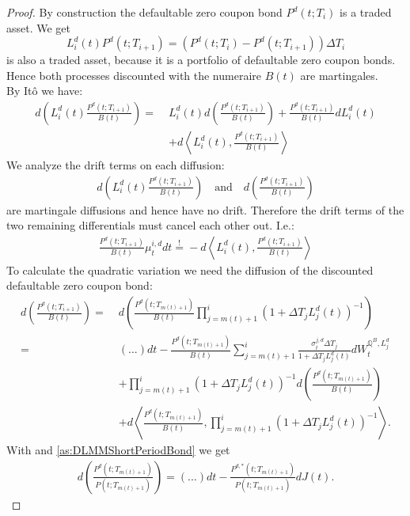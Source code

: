 \documentclass[12pt]{article}
\newcommand{\mbeq}{\overset{!}{=}}
\begin{document}
	\begin{proof}
		By construction the defaultable zero coupon bond $P^d(t; T_i)$ is a traded asset.
		We get 
		\[
			L^d_i(t)P^d(t;T_{i+1}) = (P^{d}(t;T_i) - P^{d}(t;T_{i+1}))\Delta T_i
		\]
		is also a traded asset, because it is a portfolio of defaultable zero coupon bonds. Hence both processes discounted with the numeraire $B(t)$ are martingales.\\
		By Itô we have:
		\begin{align*}
			d\left(L_i^d(t)\frac{P^d(t;T_{i+1})}{B(t)}\right) = \; &L_i^d(t) d\left(\frac{P^d(t;T_{i+1})}{B(t)}\right) +  \frac{P^d(t;T_{i+1})}{B(t)}dL_i^d(t) \\
			&+ d \left\langle  L_i^d(t), \frac{P^d(t;T_{i+1})}{B(t)} \right\rangle
		\end{align*}
		We analyze the drift terms on each diffusion:
		\begin{align*}
			d\left(L_i^d(t)\frac{P^d(t;T_{i+1})}{B(t)}\right) 
			\quad \text{and}\quad 
			d\left(\frac{P^d(t;T_{i+1})}{B(t)}\right)
		\end{align*} 
		are martingale diffusions and hence have no drift.
		Therefore the drift terms of the two remaining differentials must cancel each other out. I.e.:
		\begin{align}\label{defDriftDeriv}
			\frac{P^d(t;T_{i+1})}{B(t)} \mu^{i, d}_t dt \mbeq - d \left\langle  L_i^d(t), \frac{P^d(t;T_{i+1})}{B(t)} \right\rangle
		\end{align}
		To calculate the quadratic variation we need the diffusion of the discounted defaultable zero coupon bond:
		\begin{align*}
			d\left(\frac{P^d(t;T_{i+1})}{B(t)}\right) = \;&
			d\left(\frac{P^d(t;T_{m(t)+1})}{B(t)} \prod_{j=m(t)+1}^{i}(1+\Delta T_j L^d_j(t))^{-1}\right)\\
			 = \;& (...)dt - \frac{P^d(t;T_{m(t)+1})}{B(t)} \sum_{j=m(t)+1}^{i}\frac{ \sigma^{j, d}_t \Delta T_j}{1 + \Delta T_j L^d_j(t)} dW^{\mathbb{Q}^B, L^d_j}_t \\
			 & + \prod_{j=m(t)+1}^{i}(1+\Delta T_j L^d_j(t))^{-1} d\left(\frac{P^d(t;T_{m(t)+1})}{B(t)}\right)\\
			 & + d\left\langle\frac{P^d(t;T_{m(t)+1})}{B(t)}, \prod_{j=m(t)+1}^{i}(1+\Delta T_j L^d_j(t))^{-1}\right\rangle.
		\end{align*}
		With  and \ref{as:DLMMShortPeriodBond} we get 
		\begin{align*}
			d\left(\frac{P^d(t;T_{m(t)+1})}{P(t;T_{m(t)+1})}\right) = (...)dt - \frac{P^{d,*}(t;T_{m(t)+1})}{P(t;T_{m(t)+1})}dJ(t).

\end{align*}
\end{proof}
\end{document}

